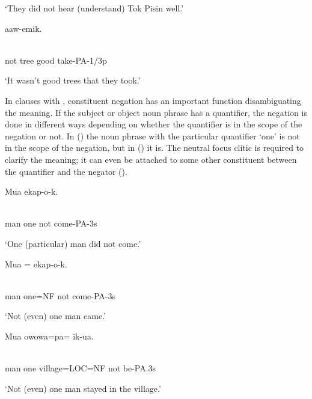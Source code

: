 `They did not hear (understand) Tok Pisin well.'

\ea%
\label{ex:x1105}
\gll {} aaw-e\textstyleEmphasizedVernacularWords{-}mik. \\
      \\
\glt
\z

not  tree  good  take-PA-1/3p

`It wasn't good trees that they took.'

In clauses with , constituent negation has an important function disambiguating the meaning. If the subject or object noun phrase has a quantifier, the negation is done in different ways depending on whether the quantifier is in the scope of the negation or not. In () the noun phrase with the particular quantifier  `one' is not in the scope of the negation, but in () it is. The neutral focus clitic is required to clarify the meaning; it can even be attached to some other constituent between the quantifier and the negator ().

\ea%
\label{ex:x1142}
\gll Mua      ekap-o-k. \\
      \\
\glt
\z

man  one  not  come-PA-3s

`One (particular) man did not come.'

\ea%
\label{ex:x1143}
\gll Mua  =    ekap-o-k. \\
      \\
\glt
\z

man  one=NF  not  come-PA-3s

`Not (even) one man came.'

\ea%
\label{ex:x1147}
\gll Mua    owowa=pa=    ik-ua. \\
      \\
\glt
\z

man  one  village=LOC=NF  not  be-PA.3s

`Not (even) one man stayed in the village.'

